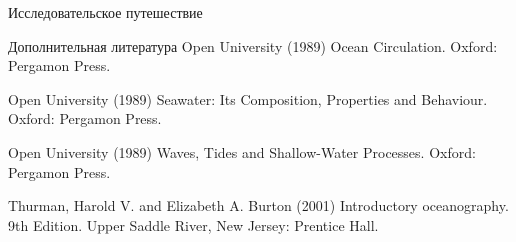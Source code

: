 \begin{chapter}{Исследовательское путешествие}
\begin{section}{Дополнительная литература}
Open University (1989) Ocean Circulation. Oxford: Pergamon Press. 
%

Open University (1989) Seawater: Its Composition, Properties and Behaviour. 
Oxford: Pergamon Press. 
%

Open University (1989) Waves, Tides and Shallow-Water Processes. 
Oxford: Pergamon Press. 
%


Thurman, Harold V. and Elizabeth A. Burton (2001) Introductory oceanography. 
9th Edition. Upper Saddle River, New Jersey: Prentice Hall.
\end{section}

\end{chapter}
